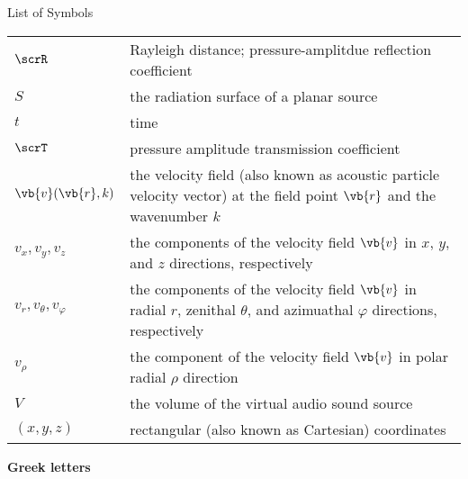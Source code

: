 \begin{frontmatterpage}{List of Symbols}
\begin{longtable}[H]{lp{}}
            $\scrR$ & Rayleigh distance; pressure-amplitdue reflection coefficient \\
            $S$ & the radiation surface of a planar source \\
            $t$ & time \\
            $\scrT$ & pressure amplitude transmission coefficient \\
            $\vb{v}(\vb{r}, k)$ & the velocity field (also known as acoustic particle velocity vector) at the field point $\vb{r}$ and the wavenumber $k$\\
            $v_x, v_y ,v_z$ & the components of the velocity field $\vb{v}$ in $x$, $y$, and $z$ directions, respectively\\
            $v_r, v_\theta ,v_\varphi$ & the components of the velocity field $\vb{v}$ in radial $r$, zenithal $\theta$, and azimuathal $\varphi$ directions, respectively\\
            $v_\rho$ & the component of the velocity field $\vb{v}$ in polar radial $\rho$ direction\\
            $V$ & the volume of the virtual audio sound source \\
            $(x,y,z)$ & rectangular (also known as Cartesian) coordinates\\
        \bottomrule
    \end{longtable}
	\addtocounter{table}{-1}%

    \textbf{Greek letters}


\end{frontmatterpage}
